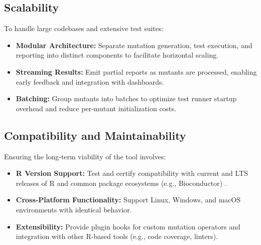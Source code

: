 \subsection{Scalability}
To handle large codebases and extensive test suites:
\begin{itemize}
  \item \textbf{Modular Architecture:} Separate mutation generation, test execution, and reporting into distinct components to facilitate horizontal scaling.
  \item \textbf{Streaming Results:} Emit partial reports as mutants are processed, enabling early feedback and integration with dashboards.
  \item \textbf{Batching:} Group mutants into batches to optimize test runner startup overhead and reduce per‐mutant initialization costs.
\end{itemize}

\subsection{Compatibility and Maintainability}
Ensuring the long‐term viability of the tool involves:
\begin{itemize}
  \item \textbf{R Version Support:} Test and certify compatibility with current and LTS releases of R and common package ecosystems (e.g., Bioconductor) \cite{gentleman2004bioconductor}.
  \item \textbf{Cross‐Platform Functionality:} Support Linux, Windows, and macOS environments with identical behavior.
  \item \textbf{Extensibility:} Provide plugin hooks for custom mutation operators and integration with other R-based tools (e.g., code coverage, linters).
\end{itemize}
